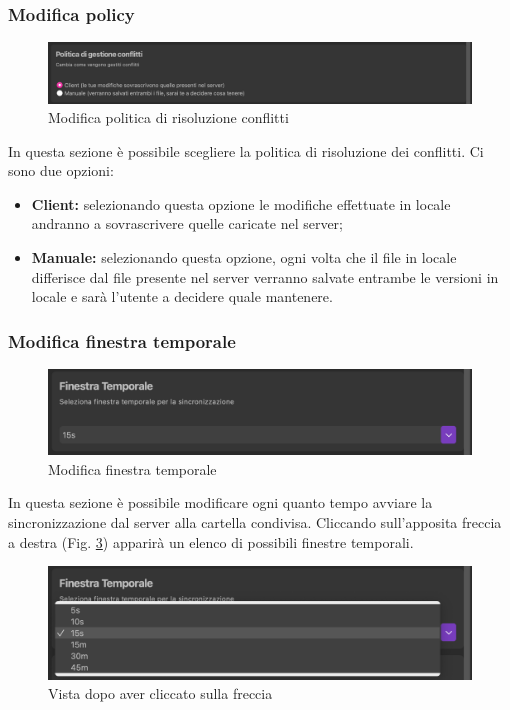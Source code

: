 \subsubsection{Modifica policy}
\label{sec:policy}
\begin{figure}[H]
    \centering
    \includegraphics[scale = 0.4]{components/img/ImpPolicy.png}
    \caption{Modifica politica di risoluzione conflitti}
    \label{fig:policy}
\end{figure}
In questa sezione è possibile scegliere la politica di risoluzione dei conflitti. Ci sono due opzioni:
\begin{itemize}
\item\textbf{Client:} selezionando questa opzione le modifiche effettuate in locale andranno a sovrascrivere quelle caricate nel server;\
\item\textbf{Manuale:} selezionando questa opzione, ogni volta che il file in locale differisce dal file presente nel server verranno salvate entrambe le versioni in locale e sarà l'utente a decidere quale mantenere.\
\end{itemize}

\subsubsection{Modifica finestra temporale}
\label{sec:finestra temporale}
\begin{figure}[H]
    \centering
    \includegraphics[scale = 0.65]{components/img/ImpFinTempA.png}
    \caption{Modifica finestra temporale}
    \label{fig:finTempA}
\end{figure}
In questa sezione è possibile modificare ogni quanto tempo avviare la sincronizzazione dal server alla cartella condivisa. Cliccando sull'apposita freccia a destra (Fig. \ref{fig:finTempC}) apparirà un elenco di possibili finestre temporali. 
\begin{figure}[H]
    \centering
    \includegraphics[scale = 0.65]{components/img/ImpFinTempC.png}
    \caption{Vista dopo aver cliccato sulla freccia}
    \label{fig:finTempC}
\end{figure}

